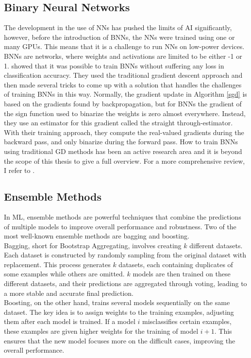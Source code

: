 \subsection{Binary Neural Networks}
The development in the use of NNs has pushed the limits of AI significantly, however, before the introduction of BNNs, the NNs were trained using one or many GPUs. This means that it is a challenge to run NNs on low-power devices. BNNs are networks, where weights and activations are limited to be either -1 or 1. \cite{Hubara2016} showed that it was possible to train BNNs without suffering any loss in classification accuracy. They used the traditional gradient descent approach and then made several tricks to come up with a solution that handles the challenges of training BNNs in this way. Normally, the gradient update in Algorithm \ref{sgd} is based on the gradients found by backpropagation, but for BNNs the gradient of the sign function used to binarize the weights is zero almost everywhere. Instead, they use an estimator for this gradient called the straight through-estimator. With their training approach, they compute the real-valued gradients during the backward pass, and only binarize during the forward pass. How to train BNNs using traditional GD methods has been an active research area and it is beyond the scope of this thesis to give a full overview. For a more comprehensive review, I refer to \cite{yuan2023}. 

\subsection{Ensemble Methods}
In ML, ensemble methods are powerful techniques that combine the predictions of multiple models to improve overall performance and robustness. Two of the most well-known ensemble methods are bagging and boosting. \\

\noindent Bagging, short for Bootstrap Aggregating, involves creating $k$ different datasets. Each dataset is constructed by randomly sampling from the original dataset with replacement. This process generates $k$ datasets, each containing duplicates of some examples while others are omitted. $k$ models are then trained on these different datasets, and their predictions are aggregated through voting, leading to a more stable and accurate final prediction. \\

\noindent Boosting, on the other hand, trains several models sequentially on the same dataset. The key idea is to assign weights to the training examples, adjusting them after each model is trained. If a model $i$ misclassifies certain examples, these examples are given higher weights for the training of model $i+1$. This ensures that the new model focuses more on the difficult cases, improving the overall performance. \\


